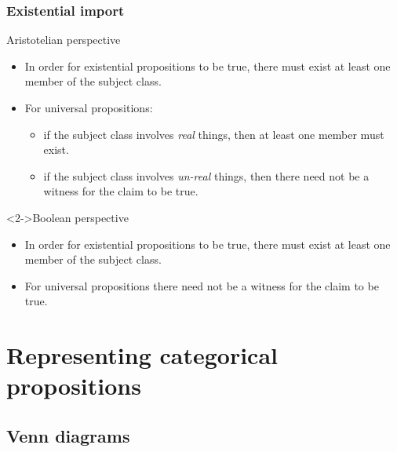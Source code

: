 \documentclass[10pt,letterpaper,xcolor=dvipsnames,handout]{beamer}
\begin{document}
\begin{frame}
  \frametitle{Existential import}
  
  \begin{block}{Aristotelian perspective}
    \begin{itemize}
      \item In order for existential propositions to be true, there must exist at least one member of the subject class.
      \item For universal propositions:
        \begin{itemize}
          \item if the subject class involves \textit{real} things, then at least one member must exist. 
          \item if the subject class involves \textit{un-real} things, then there need not be a witness for the claim to be true. 
        \end{itemize} 
    \end{itemize}
  \end{block}
  
    \begin{block}<2->{Boolean perspective}
    \begin{itemize}
      \item In order for existential propositions to be true, there must exist at least one member of the subject class.
      \item For universal propositions there need not be a witness for the claim to be true.
    \end{itemize}
  \end{block}
\end{frame}

\section{Representing categorical propositions}
\subsection{Venn diagrams}
\end{document}
